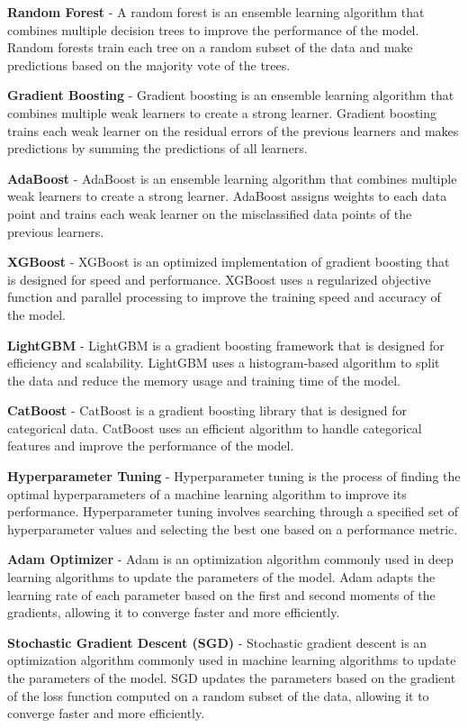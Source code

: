 \textbf{Random Forest} - A random forest is an ensemble learning algorithm that combines multiple decision trees to improve the performance of the model. Random forests train each tree on a random subset of the data and make predictions based on the majority vote of the trees.

\textbf{Gradient Boosting} - Gradient boosting is an ensemble learning algorithm that combines multiple weak learners to create a strong learner. Gradient boosting trains each weak learner on the residual errors of the previous learners and makes predictions by summing the predictions of all learners.

\textbf{AdaBoost} - AdaBoost is an ensemble learning algorithm that combines multiple weak learners to create a strong learner. AdaBoost assigns weights to each data point and trains each weak learner on the misclassified data points of the previous learners.

\textbf{XGBoost} - XGBoost is an optimized implementation of gradient boosting that is designed for speed and performance. XGBoost uses a regularized objective function and parallel processing to improve the training speed and accuracy of the model.

\textbf{LightGBM} - LightGBM is a gradient boosting framework that is designed for efficiency and scalability. LightGBM uses a histogram-based algorithm to split the data and reduce the memory usage and training time of the model.

\textbf{CatBoost} - CatBoost is a gradient boosting library that is designed for categorical data. CatBoost uses an efficient algorithm to handle categorical features and improve the performance of the model.

\textbf{Hyperparameter Tuning} - Hyperparameter tuning is the process of finding the optimal hyperparameters of a machine learning algorithm to improve its performance. Hyperparameter tuning involves searching through a specified set of hyperparameter values and selecting the best one based on a performance metric.

\textbf{Adam Optimizer} - Adam is an optimization algorithm commonly used in deep learning algorithms to update the parameters of the model. Adam adapts the learning rate of each parameter based on the first and second moments of the gradients, allowing it to converge faster and more efficiently.

\textbf{Stochastic Gradient Descent (SGD)} - Stochastic gradient descent is an optimization algorithm commonly used in machine learning algorithms to update the parameters of the model. SGD updates the parameters based on the gradient of the loss function computed on a random subset of the data, allowing it to converge faster and more efficiently.